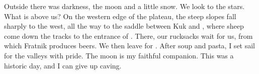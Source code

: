  Outside there was darkness, the moon and a little snow. We look to the stars. What is above us?  On the western edge of the  plateau, the steep slopes fall sharply to the west, all the way to the saddle between Kuk and , where sheep come down the tracks to the entrance of . There, our rucksacks wait for us, from which Fratnik produces beers. We then leave for . After soup and pasta, I set sail for the valleys with pride. The moon is my faithful companion. This was a historic day, and I can give up caving.
 

